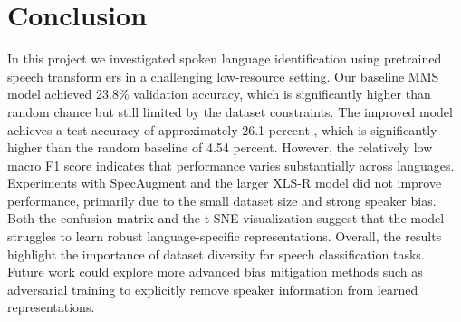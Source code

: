 \documentclass[11pt]{article}
\begin{document}
\section{Conclusion}
In this project we investigated spoken language identification using pretrained speech transform
ers in a challenging low-resource setting. Our baseline MMS model achieved 23.8\% validation
accuracy, which is significantly higher than random chance but still limited by the dataset
constraints.
The improved model achieves a test accuracy of approximately 26.1 percent , which is
significantly higher than the random baseline of 4.54 percent. However, the relatively low
macro F1 score indicates that performance varies substantially across languages.
Experiments with SpecAugment and the larger XLS-R model did not improve performance,
primarily due to the small dataset size and strong speaker bias. Both the confusion matrix
and the t-SNE visualization suggest that the model struggles to learn robust language-specific
representations.
Overall, the results highlight the importance of dataset diversity for speech classification
tasks. Future work could explore more advanced bias mitigation methods such as adversarial
training to explicitly remove speaker information from learned representations.
\end{document}
